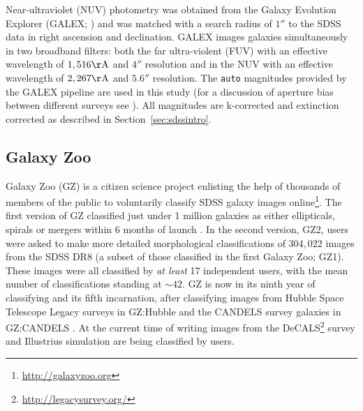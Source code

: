 Near-ultraviolet (NUV) photometry was obtained from the Galaxy Evolution Explorer (GALEX; \citealt{Martin05}) and was matched with a search radius of $1''$ to the SDSS data in right ascension and declination. GALEX images galaxies simultaneously in two broadband filters: both the far ultra-violent (FUV) with an effective wavelength of $1,516\rm{\AA}$ and $4''$ resolution and in the NUV with an effective wavelength of $2,267\rm{\AA}$ and $5.6''$ resolution. The {\tt auto} magnitudes provided by the GALEX pipeline are used in this study (for a discussion of aperture bias between different surveys see \citealt{hill11}). All magnitudes are k-corrected and extinction corrected as described in Section~\ref{sec:sdssintro}.

\subsection{Galaxy Zoo}\label{sec:GZ}

Galaxy Zoo (GZ) is a citizen science project enlisting the help of thousands of members of the public to voluntarily classify SDSS galaxy images online\footnote{\url{http://galaxyzoo.org}}. The first version of GZ classified just under 1 million galaxies as either ellipticals, spirals or mergers within 6 months of launch \citep{lintott08, Lintott11}. In the second version, GZ2, users were asked to make more detailed morphological classifications of $304, 022$ images from the SDSS DR8 (a subset of those classified in the first Galaxy Zoo; GZ1). These images were all classified by \emph{at least} 17 independent users, with the mean number of classifications standing at $\sim42$. GZ is now in its ninth year of classifying and its fifth incarnation, after classifying images from Hubble Space Telescope Legacy surveys in GZ:Hubble \citep{willett16} and the CANDELS survey galaxies in GZ:CANDELS \citep{simmons16}. At the current time of writing images from the DeCALS\footnote{\url{http://legacysurvey.org/}} survey and Illustrius simulation \citep{vogelsberger14, genel14} are being classified by users. 

